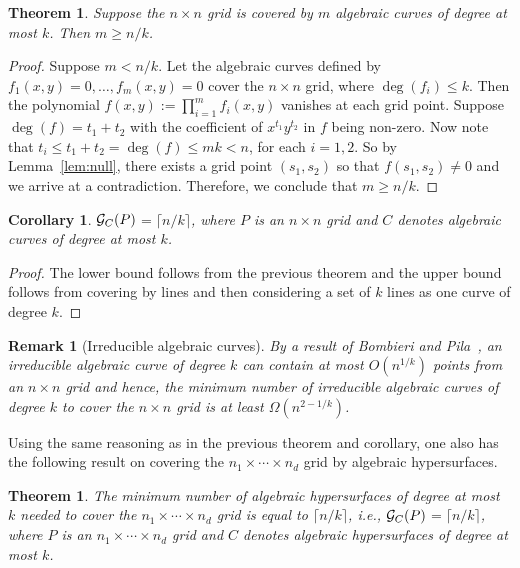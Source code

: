 \documentclass[
final
]{dmtcs-episciences}
\numberwithin{equation}{subsection}
\newtheorem{thm}[defn]{Theorem}%
\newtheorem{cor}[defn]{Corollary}%
\newtheorem{rmk}[defn]{Remark}
\newcommand{\ga}{${\cal G}_C(P)$}
\begin{document}
\begin{thm}
	Suppose the $n\times n$ grid is covered by $m$ algebraic curves of degree at most $k$. Then $m\geq n/k$.
\end{thm}

\begin{proof}
	Suppose $m<n/k$. Let the algebraic curves defined by $f_1(x,y)=0,\ldots ,f_m(x,y)=0$ cover the $n\times n$ grid, where $\deg(f_i)\leq k$. Then the polynomial $f(x,y):=\prod_{i=1}^m f_i(x,y)$ vanishes at each grid point. Suppose $\deg (f) = t_1+t_2$ with the coefficient of $x^{t_1}y^{t_2}$ in $f$ being non-zero. Now note that $t_i\leq t_1+t_2 = \deg (f)\leq mk < n$, for each $i=1,2$. So by Lemma~\ref{lem:null}, there exists a grid point $(s_1, s_2)$ so that $f(s_1, s_2) \ne 0$ and we arrive at a contradiction. Therefore, we conclude that $m\geq n/k$.
\end{proof}

\begin{cor}
	\ga $=\lceil n/k\rceil$, where $P$ is an $n\times n$ grid and $C$ denotes algebraic curves of degree at most $k$.
\end{cor}

\begin{proof}
	The lower bound follows from the previous theorem and the upper bound follows from covering by lines and then considering a set of $k$ lines as one curve of degree $k$.
\end{proof}

\begin{rmk}[Irreducible algebraic curves]
	By a result of Bombieri and Pila~\cite{bombieri}, an {\it irreducible} algebraic curve of degree $k$ can contain at most $O(n^{1/k})$ points from an $n \times n$ grid and hence, the minimum number of irreducible algebraic curves of degree $k$ to cover the $n\times n$ grid is at least $\Omega (n^{2-1/k})$.
	
\end{rmk}

Using the same reasoning as in the previous theorem and corollary, one also has the following result on covering the $n_1\times\cdots \times n_d$ grid by algebraic hypersurfaces.

\begin{thm}
	The minimum number of algebraic hypersurfaces of degree at most $k$ needed to cover the $n_1\times\cdots \times n_d$ grid is equal to $\lceil n/k\rceil$, i.e., \ga $=\lceil n/k\rceil$, where $P$ is an $n_1\times\cdots \times n_d$ grid and $C$ denotes algebraic hypersurfaces of degree at most $k$.
\end{thm}
\end{document}
